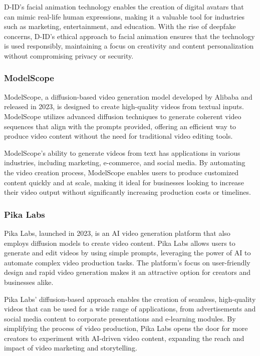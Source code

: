 D-ID's facial animation technology enables the creation of digital avatars that can mimic real-life human expressions, making it a valuable tool for industries such as marketing, entertainment, and education. 
With the rise of deepfake concerns, D-ID's ethical approach to facial animation ensures that the technology is used responsibly, maintaining a focus on creativity and content personalization without compromising privacy or security.

\subsubsection{ModelScope}

ModelScope, a diffusion-based video generation model developed by Alibaba and released in 2023, is designed to create high-quality videos from textual inputs. 
ModelScope utilizes advanced diffusion techniques to generate coherent video sequences that align with the prompts provided, offering an efficient way to produce video content without the need for traditional video editing tools.

ModelScope's ability to generate videos from text has applications in various industries, including marketing, e-commerce, and social media. 
By automating the video creation process, ModelScope enables users to produce customized content quickly and at scale, making it ideal for businesses looking to increase their video output without significantly increasing production costs or timelines.

\subsubsection{Pika Labs}

Pika Labs, launched in 2023, is an AI video generation platform that also employs diffusion models to create video content. 
Pika Labs allows users to generate and edit videos by using simple prompts, leveraging the power of AI to automate complex video production tasks. 
The platform's focus on user-friendly design and rapid video generation makes it an attractive option for creators and businesses alike.

Pika Labs' diffusion-based approach enables the creation of seamless, high-quality videos that can be used for a wide range of applications, from advertisements and social media content to corporate presentations and e-learning modules. 
By simplifying the process of video production, Pika Labs opens the door for more creators to experiment with AI-driven video content, expanding the reach and impact of video marketing and storytelling.

